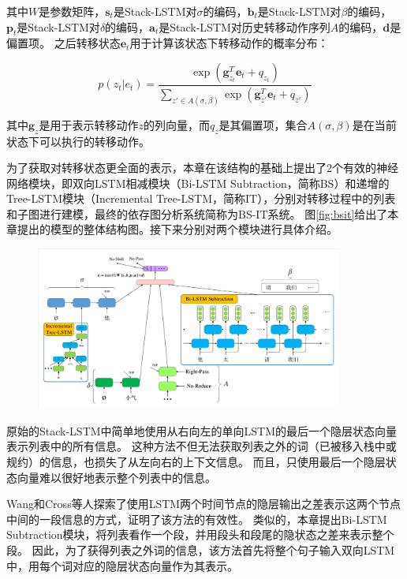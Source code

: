 其中$W$是参数矩阵，$\bm{s}_t$是Stack-LSTM对$\sigma$的编码，$\bm{b}_t$是Stack-LSTM对$\beta$的编码， $\bm{p}_t$是Stack-LSTM对$\delta$的编码，$\bm{a}_t$是Stack-LSTM对历史转移动作序列$A$的编码，$\bm{d}$是偏置项。
之后转移状态$\bm{e}_t$用于计算该状态下转移动作的概率分布：

\vspace{-0.6em}
\begin{equation}
	\label{eq:trans-softmax}
	p(z_t|e_t)=\frac{\exp(\bm{g}^T_{z_t}\bm{e}_t + q_{z_t})}{\sum_{z'\in A(\sigma, \beta)}\exp (\bm{g}^T_{z'}\bm{e}_t+q_{z'})}
\end{equation}

其中$\bm{g}_z$是用于表示转移动作$z$的列向量，而$q_z$是其偏置项，集合$A(\sigma,\beta)$是在当前状态下可以执行的转移动作。

为了获取对转移状态更全面的表示，本章在该结构的基础上提出了2个有效的神经网络模块，即双向LSTM相减模块（Bi-LSTM Subtraction，简称BS）和递增的Tree-LSTM模块（Incremental Tree-LSTM，简称IT），分别对转移过程中的列表和子图进行建模，最终的依存图分析系统简称为BS-IT系统。
图\ref{fig:bsit}给出了本章提出的模型的整体结构图。接下来分别对两个模块进行具体介绍。

\begin{figure}[hbtp]
	\centering
	\includegraphics[width=0.9\textwidth]{figures/bs-it.pdf}
\end{figure}

原始的Stack-LSTM中简单地使用从右向左的单向LSTM的最后一个隐层状态向量表示列表中的所有信息。
这种方法不但无法获取列表之外的词（已被移入栈中或规约）的信息，也损失了从左向右的上下文信息。
而且，只使用最后一个隐层状态向量难以很好地表示整个列表中的信息。

Wang和Cross等人探索了使用LSTM两个时间节点的隐层输出之差表示这两个节点中间的一段信息的方式，证明了该方法的有效性。\cite{wang-chang-2016-graph,cross-huang-2016-span}
类似的，本章提出Bi-LSTM Subtraction模块，将列表看作一个段，并用段头和段尾的隐状态之差来表示整个段。
因此，为了获得列表之外词的信息，该方法首先将整个句子输入双向LSTM中，用每个词对应的隐层状态向量作为其表示。

